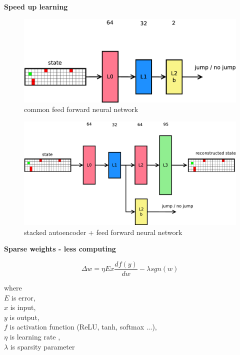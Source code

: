 \documentclass[xcolor=dvipsnames]{beamer}
\begin{document}
\begin{frame}{\bf Speed up learning}

\begin{figure}[htbp]
  \centering
  \includegraphics[scale=0.21]{../../diagrams/fnn.png}
  \caption*{common feed forward neural network}
\end{figure}

\begin{figure}[htbp]
  \centering
  \includegraphics[scale=0.21]{../../diagrams/hnn.png}
  \caption*{stacked autoencoder + feed forward neural network}
\end{figure}

\end{frame}


\begin{frame}{\bf Sparse weights - less computing}

\begin{equation*}
  \label{eq:weights_training}
  \Delta w = \eta E x \frac{df(y)}{dw} - \lambda sgn(w)
\end{equation*}

where \\
$E$ is error, \\
$x$ is input, \\
$y$ is output, \\
$f$ is activation function (ReLU, tanh, softmax ...), \\
$\eta$ is learning rate , \\
$\lambda$ is sparsity parameter

\end{frame}
\end{document}
